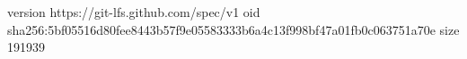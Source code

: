 version https://git-lfs.github.com/spec/v1
oid sha256:5bf05516d80fee8443b57f9e05583333b6a4c13f998bf47a01fb0c063751a70e
size 191939
